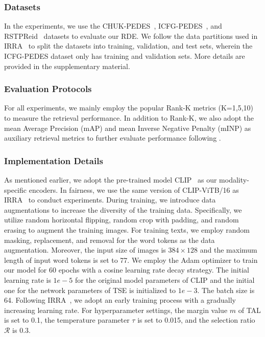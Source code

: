 \documentclass[10pt,twocolumn,letterpaper]{article}
\begin{document}
\subsubsection{Datasets} 
In the experiments, we use the CHUK-PEDES~\cite{li2017person}, ICFG-PEDES~\cite{ding2021semantically}, and RSTPReid~\cite{zhu2021dssl} datasets to evaluate our RDE. We follow the data partitions used in IRRA~\cite{jiang2023cross} to split the datasets into training, validation, and test sets, wherein the ICFG-PEDES dataset only has training and validation sets. More details are provided in the supplementary material.

\subsubsection{Evaluation Protocols}
For all experiments, we mainly employ the popular Rank-K metrics (K=1,5,10) to measure the retrieval performance. In addition to Rank-K, we also adopt the mean Average Precision (mAP) and mean Inverse Negative Penalty (mINP) as auxiliary retrieval metrics to further evaluate performance following \cite{jiang2023cross}.

\subsubsection{Implementation Details}
As mentioned earlier, we adopt the pre-trained model CLIP~\cite{radford2021learning} as our modality-specific encoders. In fairness, we use the same version of CLIP-ViTB/16 as IRRA~\cite{jiang2023cross} to conduct experiments. During training, we introduce data augmentations to increase the diversity of the training data. Specifically, we utilize random horizontal flipping, random crop with padding, and random erasing to augment the training images. For training texts, we employ random masking, replacement, and removal for the word tokens as the data augmentation.
Moreover, the input size of images is $384\times128$ and the maximum length of input word tokens is set to 77. We employ the Adam optimizer to train our model for 60 epochs with a cosine learning rate decay strategy. The initial learning rate is $1e-5$ for the original model parameters of CLIP and the initial one for the network parameters of TSE is initialized to $1e-3$. The batch size is 64. Following IRRA~\cite{jiang2023cross}, we adopt an early training process with a gradually increasing learning rate. For hyperparameter settings, the margin value $m$ of TAL is set to 0.1, the temperature parameter $\tau$ is set to 0.015, and the selection ratio $\mathcal{R}$ is 0.3. 
\end{document}
